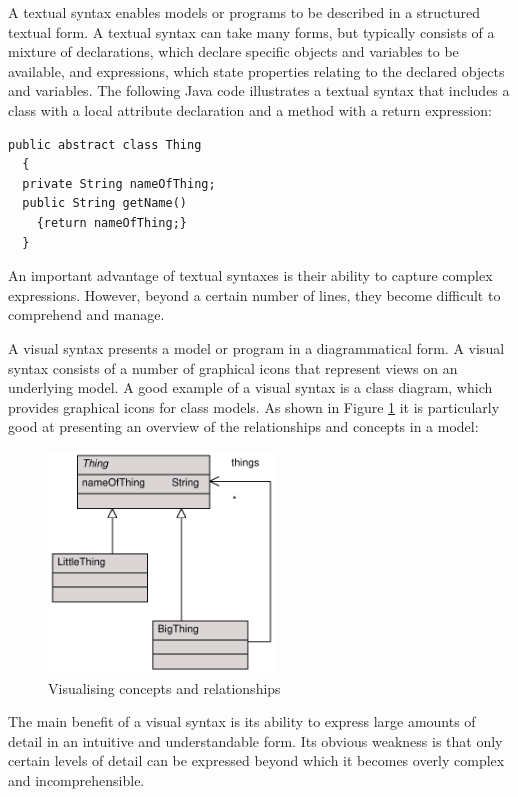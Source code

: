 A textual syntax enables models or programs to be described in a
structured textual form. A textual syntax can take many forms, but
typically consists of a mixture of declarations, which declare
specific objects and variables to be available, and expressions,
which state properties relating to the declared objects and
variables. The following Java code illustrates a textual syntax
that includes a class with a local attribute declaration and a
method with a return expression:

\lstset{language=Java}
\begin{lstlisting}
public abstract class Thing
  {
  private String nameOfThing;
  public String getName()
    {return nameOfThing;}
  }
\end{lstlisting}
\lstset{language=XOCL}

An important advantage of textual syntaxes is their ability to
capture complex expressions. However, beyond a certain number of
lines, they become difficult to comprehend and manage.

A visual syntax presents a model or program in a diagrammatical
form. A visual syntax consists  of a number of graphical icons
that represent views on an underlying model. A good example of a
visual syntax is a class diagram, which provides graphical icons
for class models. As shown in Figure \ref{classDiagramView} it is
particularly good at presenting an overview of the relationships
and concepts in a model:

\begin{figure}[htb]
\begin{center}
\includegraphics[width=6cm]{Metamodelling/figures/MMExample}
\caption{Visualising concepts and relationships}
\label{classDiagramView}
\end{center}
\end{figure}

The main benefit of a visual syntax is its ability to express
large amounts of detail in an intuitive and understandable form.
Its obvious weakness is that only certain levels of detail can be
expressed beyond which it becomes overly complex and
incomprehensible.

